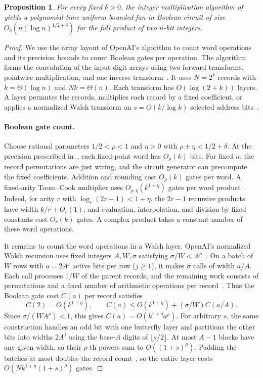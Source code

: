 \documentclass[11pt]{article}
\newtheorem{proposition}[theorem]{Proposition}
\begin{document}
\begin{proposition}\label{prop:boolean-mult}
For every fixed $\delta > 0$, the integer multiplication algorithm of~\cite{openai2026mult} yields a polynomial-time uniform bounded-fan-in Boolean circuit of size $O_\delta(n(\log n)^{1/2+\delta})$ for the full product of two $n$-bit integers.
\end{proposition}

\begin{proof}
We use the array layout of OpenAI's algorithm to count word operations and its precision bounds to count Boolean gates per operation. The algorithm forms the convolution of the input digit arrays using two forward transforms, pointwise multiplication, and one inverse transform~\cite[Section~5]{openai2026mult}. It uses $N=2^k$ records with $k=\Theta(\log n)$ and $Nk=\Theta(n)$. Each transform has $O(\log(2+k))$ layers. A layer permutes the records, multiplies each record by a fixed coefficient, or applies a normalized Walsh transform on $s=O(k/\log k)$ selected address bits~\cite[Lemma~5.2]{openai2026mult}.

\paragraph{Boolean gate count.}
Choose rational parameters $1/2<\rho<1$ and $\eta>0$ with $\rho+\eta<1/2+\delta$. At the precision prescribed in~\cite[Lemma~4.1 and Section~5.4]{openai2026mult}, each fixed-point word has $O_\rho(k)$ bits. For fixed $n$, the record permutations are just wiring, and the circuit generator can precompute the fixed coefficients. Addition and rounding cost $O_\rho(k)$ gates per word. A fixed-arity Toom--Cook multiplier uses $O_{\rho,\eta}(k^{1+\eta})$ gates per word product~\cite[Section~1.3.3]{bz2010}. Indeed, for arity $r$ with $\log_r(2r-1)<1+\eta$, the $2r-1$ recursive products have width $k/r+O_r(1)$, and evaluation, interpolation, and division by fixed constants cost $O_r(k)$ gates. A complex product takes a constant number of these word operations.

It remains to count the word operations in a Walsh layer. OpenAI's normalized Walsh recursion uses fixed integers $A,W,\sigma$ satisfying $\sigma/W<A^\rho$~\cite[Proposition~5.2 and Eq.~(5.3)]{openai2026fft}. On a batch of $W$ rows with $a=2A^j$ active bits per row ($j\ge 1$), it makes $\sigma$ calls of width $a/A$. Each call processes $1/W$ of the parent records, and the remaining work consists of permutations and a fixed number of arithmetic operations per record~\cite[Lemma~4.1]{openai2026mult}. Thus the Boolean gate cost $C(a)$ per record satisfies
\[
C(2)=O(k^{1+\eta}),\qquad C(a)\le O(k^{1+\eta})+(\sigma/W)C(a/A).
\]
Since $\sigma/(WA^\rho)<1$, this gives $C(a)=O(k^{1+\eta}a^\rho)$. For arbitrary $s$, the same construction handles an odd bit with one butterfly layer and partitions the other bits into widths $2A^j$ using the base-$A$ digits of $\lfloor s/2\rfloor$. At most $A-1$ blocks have any given width, so their $\rho$-th powers sum to $O((1+s)^\rho)$. Padding the batches at most doubles the record count~\cite[Lemma~4.1]{openai2026mult}, so the entire layer costs $O(Nk^{1+\eta}(1+s)^\rho)$ gates.


\end{proof}
\end{document}

